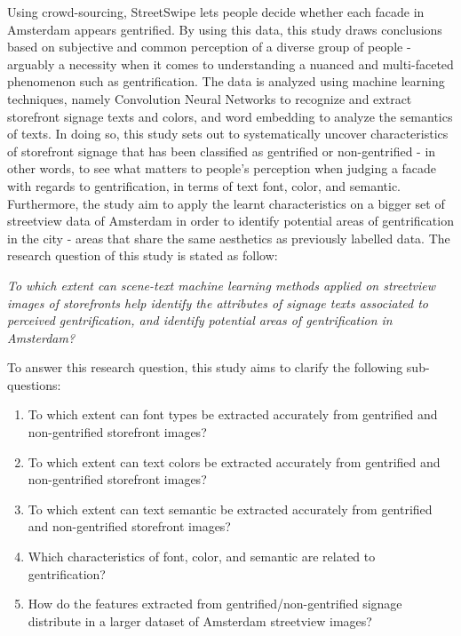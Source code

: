 Using crowd-sourcing, StreetSwipe \cite{streetswipe} lets people decide whether each facade in Amsterdam appears gentrified. By using this data, this study draws conclusions based on subjective and common perception of a diverse group of people - arguably a necessity when it comes to understanding a nuanced and multi-faceted phenomenon such as gentrification. The data is analyzed using machine learning techniques, namely Convolution Neural Networks to recognize and extract storefront signage texts and colors, and word embedding to analyze the semantics of texts. In doing so, this study sets out to systematically uncover characteristics of storefront signage that has been classified as gentrified or non-gentrified - in other words, to see what matters to people's perception when judging a facade with regards to gentrification, in terms of text font, color, and semantic. Furthermore, the study aim to apply the learnt characteristics on a bigger set of streetview data of Amsterdam in order to identify potential areas of gentrification in the city - areas that share the same aesthetics as previously labelled data. The research question of this study is stated as follow: 

\noindent\textit{To which extent can scene-text machine learning methods applied on streetview images of storefronts help identify the attributes of signage texts associated to perceived gentrification, and identify potential areas of gentrification in Amsterdam?}

To answer this research question, this study aims to clarify the following sub-questions: 

\begin{enumerate}
    \item To which extent can font types be extracted accurately from gentrified and non-gentrified storefront images?
    \item To which extent can text colors be extracted accurately from gentrified and non-gentrified storefront images?
    \item To which extent can text semantic be extracted accurately from gentrified and non-gentrified storefront images?
    \item Which characteristics of font, color, and semantic are related to gentrification?
    \item How do the features extracted from gentrified/non-gentrified signage distribute in a larger dataset of Amsterdam streetview images?
\end{enumerate}

